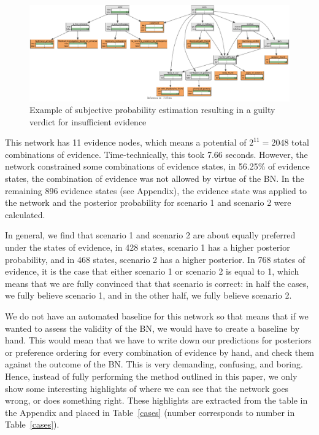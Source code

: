 \documentclass[12pt]{article}
\begin{document}
\begin{figure}[htbp]
\includegraphics[width=\linewidth]{images/oldnetwork.pdf}
\caption{Example of subjective probability estimation resulting in a guilty verdict for insufficient evidence}
\label{love}
\end{figure}%

This network has 11 evidence nodes, which means a potential of $2^11 = 2048$ total combinations of evidence. Time-technically, this took 7.66 seconds. However, the network constrained some combinations of evidence states, in 56.25\% of evidence states, the combination of evidence was not allowed by virtue of the BN. In the remaining 896 evidence states (see Appendix), the evidence state was applied to the network and the posterior probability for scenario 1 and scenario 2 were calculated.

In general, we find that scenario 1 and scenario 2 are about equally preferred under the states of evidence, in 428 states, scenario 1 has a higher posterior probability, and in 468 states, scenario 2 has a higher posterior. In 768 states of evidence, it is the case that either scenario 1 or scenario 2 is equal to 1, which means that we are fully convinced that that scenario is correct: in half the cases, we fully believe scenario 1, and in the other half, we fully believe scenario 2.

We do not have an automated baseline for this network so that means that if we wanted to assess the validity of the BN, we would have to create a baseline by hand. This would mean that we have to write down our predictions for posteriors or preference ordering for every combination of evidence by hand, and check them against the outcome of the BN. This is very demanding, confusing, and boring. Hence, instead of fully performing the method outlined in this paper, we only show some interesting highlights of where we can see that the network goes wrong, or does something right. These highlights are extracted from the table in the Appendix and placed in Table~\ref{cases} (number corresponds to number in Table~\ref{cases}).
\end{document}
